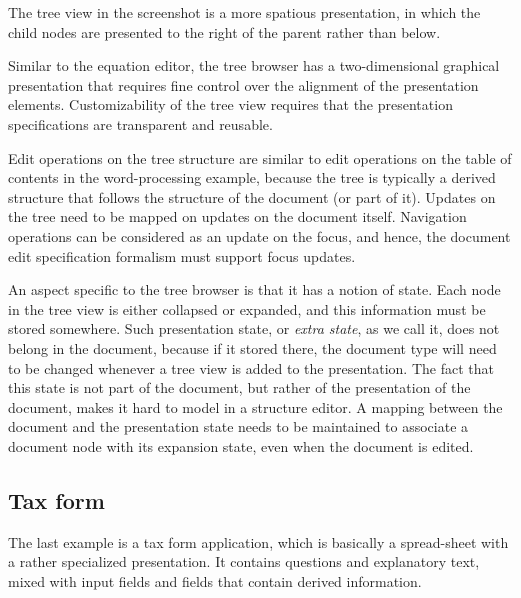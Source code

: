 The tree view in the screenshot is a more spatious presentation, in which the child nodes are presented to the right of the parent rather than below.



Similar to the equation editor, the tree browser has a two-dimensional graphical presentation that requires fine control over the alignment of the presentation elements. Customizability of the tree view requires that the presentation specifications are transparent and reusable. 

Edit operations on the tree structure are similar to edit operations on the table of contents in the word-processing example, because the tree is typically a derived structure that follows the structure of the document (or part of it). Updates on the tree need to be mapped on updates on the document itself. Navigation operations can be considered as an update on the  focus, and hence, the document edit specification formalism must support focus updates.

An aspect specific to the tree browser is that it has a notion of state. Each node in the tree view is either collapsed or expanded, and this information must be stored somewhere. Such presentation state, or {\em extra state}, as we call it, does not belong in the document, because if it stored there, the document type will need to be changed whenever a tree view is added to the presentation. The fact that this state is not part of the document, but rather of the presentation of the document, makes it hard to model in a structure editor. A mapping between the document and the presentation state needs to be maintained to associate a document node with its expansion state, even when the document is edited. 


%																
\subsection{Tax form}

The last example is a tax form application, which is basically a spread-sheet with a rather specialized presentation. It contains questions and explanatory text, mixed with input fields and fields that contain derived information. 


